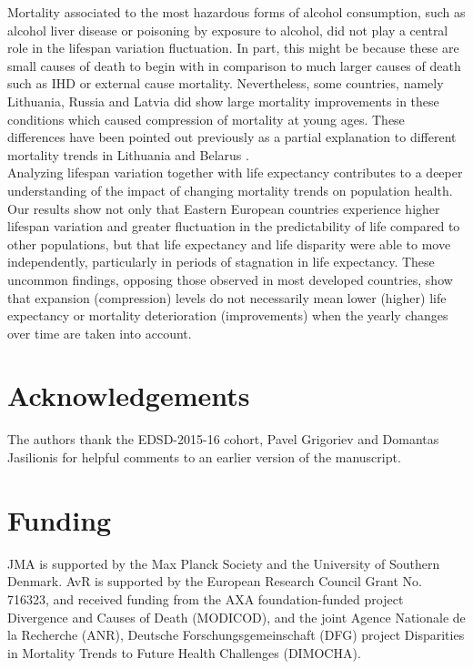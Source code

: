 \documentclass{article}
\begin{document}
\begin{spacing}{1.5}
Mortality associated to the most hazardous forms of alcohol consumption, such as alcohol liver disease or poisoning by exposure to alcohol, did not play a central role in the lifespan variation fluctuation. In part, this might be because these are small causes of death to begin with in comparison to much larger causes of death such as IHD or external cause mortality. Nevertheless, some countries, namely Lithuania, Russia and Latvia did show large mortality improvements in these conditions which caused compression of mortality at young ages. These differences have been pointed out previously as a partial explanation to different mortality trends in Lithuania and Belarus \citep{grigoriev2015spatial}.\\

Analyzing lifespan variation together with life expectancy contributes to a deeper understanding of the impact of changing mortality trends on population health. Our results show not only that Eastern European countries experience higher lifespan variation and greater fluctuation in the predictability of life compared to other populations, but that life expectancy and life disparity were able to move independently, particularly in periods of stagnation in life expectancy. These uncommon findings, opposing those observed in most developed countries, show that expansion (compression) levels do not necessarily mean lower (higher) life expectancy  or mortality deterioration (improvements) when the yearly changes over time are taken into account. \\

\section*{Acknowledgements}
The authors thank the EDSD-2015-16 cohort, Pavel Grigoriev and Domantas Jasilionis for helpful comments to an earlier version of the manuscript. 

\section*{Funding}
JMA is supported by the Max Planck Society and the University of Southern Denmark. AvR is supported by the European Research Council Grant No. 716323, and received funding from the AXA foundation-funded project Divergence and Causes of Death (MODICOD), and the joint Agence Nationale de la Recherche (ANR), Deutsche Forschungsgemeinschaft (DFG) project Disparities in Mortality Trends to Future Health Challenges (DIMOCHA). 

\end{spacing}
\end{document}

